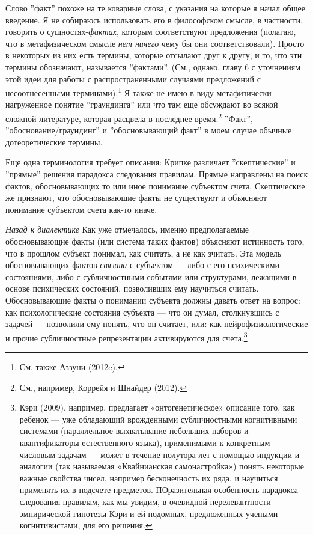 \documentclass[11pt]{book}
\begin{document}
Слово ''факт'' похоже на те коварные слова, с указания на которые я начал общее введение. Я не собираюсь использовать его в философском смысле, в частности, говорить о сущностях-\textit{фактах}, которым соответствуют предложения (полагаю, что в метафизическом смысле \textit{нет ничего} чему бы они соответствовали). Просто в некоторых из них есть термины, которые отсылают друг к другу, и то, что эти термины обозначают, называется ''фактами''. (См., однако, главу 6 с уточнениям этой идеи для работы с распространенными случаями предложений с несоотнесенными терминами).\footnote{См. также Аззуни (2012c).} Я также не имею в виду метафизически нагруженное понятие ''граундинга'' или что там еще обсуждают во всякой сложной литературе, которая расцвела в последнее время.\footnote{См., например, Коррейя и Шнайдер (2012).} ''Факт'', ''обоснование/граундинг'' и ''обосновывающий факт'' в моем случае обычные дотеоретические термины.

Еще одна терминология требует описания: Крипке различает ''скептические'' и ''прямые'' решения парадокса следования правилам. Прямые направлены на поиск фактов, обосновывающих то или иное понимание субъектом счета. Скептические же признают, что обосновывающие факты не существуют и объясняют понимание субъектом счета как-то иначе.

\textit{Назад к диалектике} \quad Как уже отмечалось, именно предполагаемые обосновывающие факты (или система таких фактов) объясняют истинность того, что в прошлом субъект понимал, как считать, а не как зчитать. Эта модель обосновывающих фактов \textit{связана} с субъектом --- либо с его психическими состояниями, либо с субличностными событями или структурами, лежащими в основе психических состояний, позволивших ему научиться считать. Обосновывающие факты о понимании субъекта должны давать ответ на вопрос: как психологические состояния субъекта --- что он думал, столкнувшись с задачей --- позволили ему понять, что он считает, или: как нейрофизиологические и прочие субличностные репрезентации активируются для счета.\footnote{Кэри (2009), например, предлагает «онтогенетическое» описание того, как ребенок — уже обладающий врожденными субличностными когнитивными системами (параллельное выхватывание небольших наборов и квантификаторы естественного языка), применимыми к конкретным числовым задачам — может в течение полутора лет с помощью индукции и аналогии (так называемая «Квайнианская самонастройка») понять некоторые важные свойства чисел, например бесконечность их ряда, и научиться применять их в подсчете предметов. ПОразительная особенность парадокса следования правилам, как мы увидим, в очевидной нерелевантности эмпирической гипотезы Кэри и ей подомных, предложенных учеными-когнитивистами, для его решения.}
\end{document}
